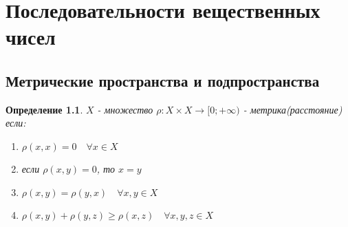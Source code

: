 \documentclass[12pt,letterpaper]{report}
\newtheorem{conj}[theorem]{Определение}
\begin{document}
\chapter{Последовательности вещественных чисел}
\section{Метрические пространства и подпространства}
    \begin{conj}
        $X$ - множество $\rho : X \times X \longrightarrow [0; + \infty)$ - метрика(расстояние)
        если: 
        \begin{enumerate}
            \item $\rho(x, x) = 0 \quad \forall x \in X$
            \item если $\rho(x, y) = 0$, то $x = y$
            \item $\rho(x, y) = \rho(y, x) \quad \forall x, y \in X$
            \item $\rho(x, y) + \rho(y, z) \geqslant \rho(x, z) \quad \forall x, y, z \in X$
        \end{enumerate}
    \end{conj}
\end{document}
